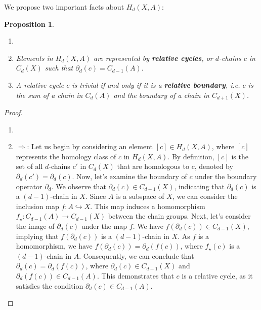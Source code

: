\documentclass{amsart}
\newtheorem{proposition}[definition]{Proposition}
\begin{document}
We propose two important facts about $H_d(X,A)$:

\begin{proposition}
\begin{enumerate}
	\item[]
	\item[1.] Elements in $H_d(X,A)$ are represented by \textbf{relative cycles}, or $d$-chains $c$ in $C_d(X)$ such that $\partial_d(c) = C_{d-1}(A)$.
	\item[2.] A relative cycle $c$ is trivial if and only if it is a \textbf{relative boundary}, i.e. $c$ is the sum of a chain in $C_d(A)$ and the boundary of a chain in $C_{d+1}(X)$.
\end{enumerate}
\end{proposition}

\begin{proof}
\begin{enumerate}
	\item[]
	\item[1.] \glqq $\Rightarrow$\grqq{}: Let us begin by considering an element $[c] \in H_d(X,A)$, where $[c]$ represents the homology class of $c$ in $H_d(X,A)$. By definition, $[c]$ is the set of all $d$-chains $c'$ in $C_d(X)$ that are homologous to $c$, denoted by $\partial_d(c') = \partial_d(c)$. Now, let's examine the boundary of $c$ under the boundary operator $\partial_d$. We observe that $\partial_d(c) \in C_{d-1}(X)$, indicating that $\partial_d(c)$ is a $(d-1)$-chain in $X$. Since $A$ is a subspace of $X$, we can consider the inclusion map $f: A \hookrightarrow X$. This map induces a homomorphism $f_\star: C_{d-1}(A) \rightarrow C_{d-1}(X)$ between the chain groups. Next, let's consider the image of $\partial_d(c)$ under the map $f$. We have $f(\partial_d(c)) \in C_{d-1}(X)$, implying that $f(\partial_d(c))$ is a $(d-1)$-chain in $X$. As $f$ is a homomorphism, we have $f(\partial_d(c)) = \partial_d(f(c))$, where $f_\star(c)$ is a $(d-1)$-chain in $A$. Consequently, we can conclude that $\partial_d(c) = \partial_d(f(c))$, where $\partial_d(c) \in C_{d-1}(X)$ and $\partial_d(f(c)) \in C_{d-1}(A)$. This demonstrates that $c$ is a relative cycle, as it satisfies the condition $\partial_d(c) \in C_{d-1}(A)$.


\end{enumerate}
\end{proof}
\end{document}
